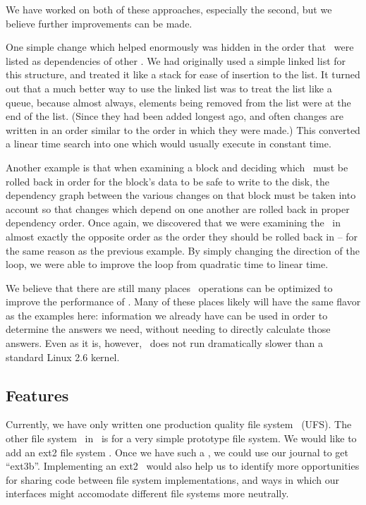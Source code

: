 We have worked on both of these approaches, especially the second, but we
believe further improvements can be made.

One simple change which helped enormously was hidden in the order that \chdescs\
were listed as dependencies of other \chdescs. We had originally used a simple
linked list for this structure, and treated it like a stack for ease of
insertion to the list. It turned out that a much better way to use the linked
list was to treat the list like a queue, because almost always, elements being
removed from the list were at the end of the list. (Since they had been added
longest ago, and often changes are written in an order similar to the order in
which they were made.) This converted a linear time search into one which would
usually execute in constant time.

Another example is that when examining a block and deciding which \chdescs\ must
be rolled back in order for the block's data to be safe to write to the disk,
the dependency graph between the various changes on that block must be taken
into account so that changes which depend on one another are rolled back in
proper dependency order. Once again, we discovered that we were examining the
\chdescs\ in almost exactly the opposite order as the order they should be
rolled back in -- for the same reason as the previous example. By simply
changing the direction of the loop, we were able to improve the loop from
quadratic time to linear time.

We believe that there are still many places \chdesc\ operations can be optimized
to improve the performance of \Kudos. Many of these places likely will have the
same flavor as the examples here: information we already have can be used in
order to determine the answers we need, without needing to directly calculate
those answers. Even as it is, however, \Kudos\ does not run dramatically slower
than a standard Linux 2.6 kernel.


\subsection {Features}
Currently, we have only written one production quality file system \module\
(UFS). The other file system \module\ in \Kudos\ is for a very simple prototype
file system. We would like to add an ext2 file system \module. Once we have such
a \module, we could use our journal \module to get ``ext3b''. Implementing an
ext2 \module\ would also help us to identify more opportunities for sharing code
between file system implementations, and ways in which our interfaces might
accomodate different file systems more neutrally.


